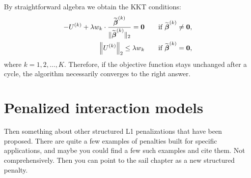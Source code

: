 By straightforward algebra  we obtain the KKT conditions:
\begin{align*}
-U^{(k)}+\lambda w_{k}\cdot\frac {\widetilde{\boldsymbol{\beta}}^{(k)} }{\Vert\widetilde{\boldsymbol{\beta}}^{(k)}\Vert_2}=\boldsymbol{0}\qquad\textrm{if }\widetilde{\boldsymbol{\beta}}^{(k)}\neq \boldsymbol{0},\\
\left\Vert
U^{(k)}
\right\Vert_2 \le\lambda w_{k}\qquad\textrm{if }\widetilde{\boldsymbol{\beta}}^{(k)}=\boldsymbol{0},
\end{align*}
where $k=1,2,\ldots,K$. Therefore, if the objective function stays unchanged after a cycle, the algorithm necessarily converges to the right
answer.




\section{Penalized interaction models}



Then something about other structured L1 penalizations that have been proposed. There are quite a few examples of penalties built for specific applications, and maybe you could find a few such examples and cite them. Not comprehensively.  Then you can point to the sail chapter as a new structured penalty.

